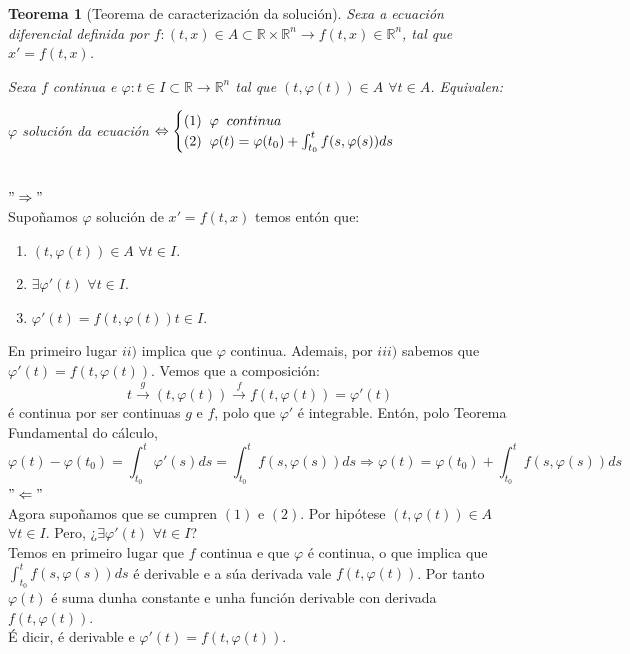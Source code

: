 \documentclass[11pt, a4paper,twoside]{article}
\makeatletter
\theoremstyle{theorem-style}  %
\newtheorem{theorem}{Teorema}[section]  %
\renewenvironment{proof}[1][\proofname]{\par
	\pushQED{\qed}%
	\normalfont \topsep6\p@\@plus6\p@\relax
	\list{}{%
		\settowidth{\leftmargin}{\quad:\hskip\labelsep}%
		\setlength{\labelwidth}{0pt}%
		\setlength{\itemindent}{-\leftmargin}%
	}%
	\item[\hskip\labelsep\itshape#1\@addpunct{:}]\ignorespaces
}{%
	\popQED\endlist\@endpefalse
}
\theoremstyle{definition-style}
\theoremstyle{example-style}
\makeatother
\begin{document}
\begin{theorem}[Teorema de caracterización da solución]\label{carac-sol}
	Sexa a ecuación diferencial definida por $ f:(t,x) \in A \subset \mathbb{R}\times \mathbb{R}^n\longrightarrow f(t,x)\in \mathbb{R}^n$, tal que $ x'=f(t,x) $. 
	
	Sexa $f$ continua e $\varphi :t \in I \subset \mathbb{R} \longrightarrow \mathbb{R}^n$ tal que $(t, \varphi (t)) \in A$ $\forall t \in A$. Equivalen:
	\begin{center}
		$\varphi$ solución da ecuación $\Leftrightarrow \begin{cases}
		(1) \hspace{0,2cm} \varphi \hspace{0,2cm} continua \\
		(2) \hspace{0,2cm} \varphi (t)= \varphi (t_0) + \int_{t_0}^{t} f(s, \varphi (s))ds
		\end{cases}$
	\end{center}
\end{theorem}
\begin{proof}\ \\
	$"\Rightarrow"$ \\
	Supoñamos $\varphi$ solución de $x' = f(t, x)$ temos entón que:
	\begin{enumerate}[\qquad i)]
	\item $(t, \varphi (t)) \in A$ $\forall t \in I$.
	\item $ \exists \varphi' (t)$ $\forall t \in I$.
	\item $ \varphi' (t) = f(t, \varphi (t)) t \in I$.
	\end{enumerate}
	En primeiro lugar $ii)$ implica que $\varphi$ continua. Ademais, por $iii)$ sabemos que $\varphi' (t) = f(t, \varphi (t))$. Vemos que a composición:
	\[t \stackrel{g}{\longrightarrow } (t, \varphi (t)) \stackrel{f}{\longrightarrow } f(t, \varphi (t)) = \varphi'(t)\]
	é continua por ser continuas $g$ e $f$, polo que $\varphi '$ é integrable. Entón, polo Teorema Fundamental do cálculo,
	\[\varphi (t) - \varphi (t_0) = \int_{t_0}^{t} \varphi' (s)ds = \int_{t_0}^{t} f(s, \varphi (s))ds \Rightarrow \varphi (t) = \varphi (t_0) + \int_{t_0}^{t} f(s, \varphi (s))ds\]
	$"\Leftarrow"$ \\
	Agora supoñamos que se cumpren $(1)$ e $(2)$. Por hipótese $(t, \varphi (t)) \in A$ $\forall t \in I$. Pero, ¿$\exists \varphi' (t)$ $\forall t \in I$?\\
	Temos en primeiro lugar que $f$ continua e que $\varphi$ é continua, o que implica que $\int_{t_0}^{t} f(s, \varphi (s))ds$ é derivable e a súa derivada vale $f(t, \varphi (t))$. Por tanto $\varphi (t)$ é suma dunha constante e unha función derivable con derivada $ f(t,\varphi(t)) $. \\
	É dicir, é derivable e $\varphi' (t) = f(t, \varphi (t))$.
\end{proof}
\end{document}
